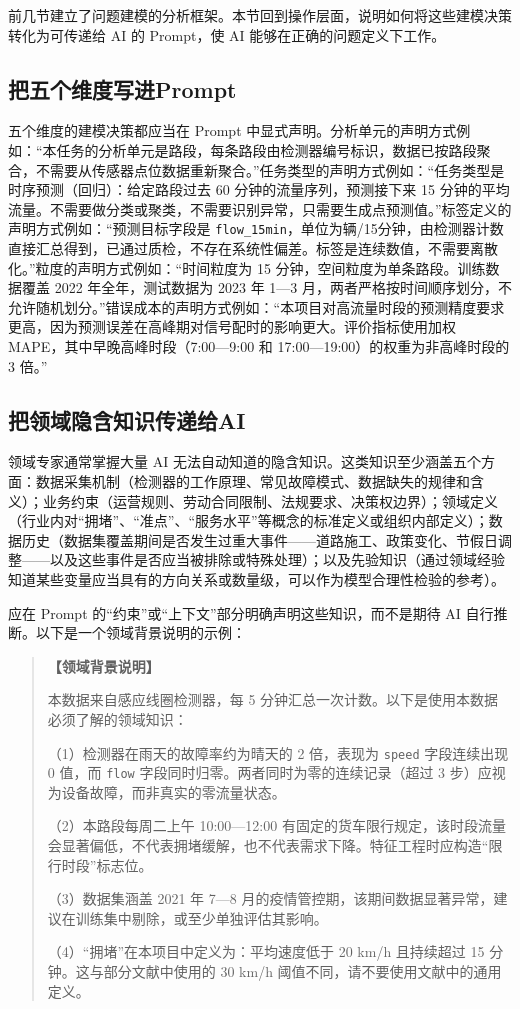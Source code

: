 前几节建立了问题建模的分析框架。本节回到操作层面，说明如何将这些建模决策转化为可传递给 AI 的 Prompt，使 AI 能够在正确的问题定义下工作。

\subsection{把五个维度写进Prompt}

五个维度的建模决策都应当在 Prompt 中显式声明。分析单元的声明方式例如：“本任务的分析单元是路段，每条路段由检测器编号标识，数据已按路段聚合，不需要从传感器点位数据重新聚合。”任务类型的声明方式例如：“任务类型是时序预测（回归）：给定路段过去 60 分钟的流量序列，预测接下来 15 分钟的平均流量。不需要做分类或聚类，不需要识别异常，只需要生成点预测值。”标签定义的声明方式例如：“预测目标字段是 \texttt{flow\_15min}，单位为辆/15分钟，由检测器计数直接汇总得到，已通过质检，不存在系统性偏差。标签是连续数值，不需要离散化。”粒度的声明方式例如：“时间粒度为 15 分钟，空间粒度为单条路段。训练数据覆盖 2022 年全年，测试数据为 2023 年 1—3 月，两者严格按时间顺序划分，不允许随机划分。”错误成本的声明方式例如：“本项目对高流量时段的预测精度要求更高，因为预测误差在高峰期对信号配时的影响更大。评价指标使用加权 MAPE，其中早晚高峰时段（7:00—9:00 和 17:00—19:00）的权重为非高峰时段的 3 倍。”

\subsection{把领域隐含知识传递给AI}

领域专家通常掌握大量 AI 无法自动知道的隐含知识。这类知识至少涵盖五个方面：数据采集机制（检测器的工作原理、常见故障模式、数据缺失的规律和含义）；业务约束（运营规则、劳动合同限制、法规要求、决策权边界）；领域定义（行业内对“拥堵”、“准点”、“服务水平”等概念的标准定义或组织内部定义）；数据历史（数据集覆盖期间是否发生过重大事件——道路施工、政策变化、节假日调整——以及这些事件是否应当被排除或特殊处理）；以及先验知识（通过领域经验知道某些变量应当具有的方向关系或数量级，可以作为模型合理性检验的参考）。

应在 Prompt 的“约束”或“上下文”部分明确声明这些知识，而不是期待 AI 自行推断。以下是一个领域背景说明的示例：

\begin{quote}
\textbf{【领域背景说明】}

本数据来自感应线圈检测器，每 5 分钟汇总一次计数。以下是使用本数据必须了解的领域知识：

（1）检测器在雨天的故障率约为晴天的 2 倍，表现为 \texttt{speed} 字段连续出现 0 值，而 \texttt{flow} 字段同时归零。两者同时为零的连续记录（超过 3 步）应视为设备故障，而非真实的零流量状态。

（2）本路段每周二上午 10:00—12:00 有固定的货车限行规定，该时段流量会显著偏低，不代表拥堵缓解，也不代表需求下降。特征工程时应构造“限行时段”标志位。

（3）数据集涵盖 2021 年 7—8 月的疫情管控期，该期间数据显著异常，建议在训练集中剔除，或至少单独评估其影响。

（4）“拥堵”在本项目中定义为：平均速度低于 20 km/h 且持续超过 15 分钟。这与部分文献中使用的 30 km/h 阈值不同，请不要使用文献中的通用定义。
\end{quote}

